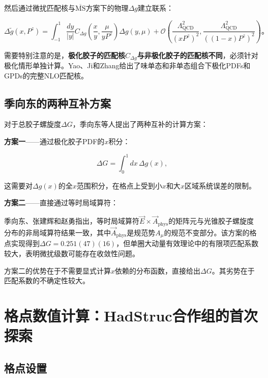 \documentclass[12pt,a4paper]{ctexart}
\theoremstyle{definition}
\begin{document}
然后通过微扰匹配核与$\overline{\text{MS}}$方案下的物理$\Delta g$建立联系\cite{Ji2017More,Yao2023}：

\begin{equation}
\Delta\tilde{g}(x, P^z) = \int_{-1}^1 \frac{dy}{|y|} C_{\Delta g}\left(\frac{x}{y}, \frac{\mu}{yP^z}\right) \Delta g(y, \mu) + \mathcal{O}\left(\frac{\Lambda_{\text{QCD}}^2}{(xP^z)^2}, \frac{\Lambda_{\text{QCD}}^2}{((1-x)P^z)^2}\right)。
\label{eq:matching_Deltag}
\end{equation}

需要特别注意的是，\textbf{极化胶子的匹配核$C_{\Delta g}$与非极化胶子的匹配核不同}，必须针对极化情形单独计算。Yao、Ji和Zhang\cite{Yao2023}给出了味单态和非单态组合下极化PDFs和GPDs的完整NLO匹配核。

\subsection{季向东的两种互补方案}

对于总胶子螺旋度$\Delta G$，季向东等人提出了两种互补的计算方案\cite{Ji2013gluon, Ji2017More}：

\textbf{方案一}——通过极化胶子PDF的$x$积分：

\begin{equation}
\Delta G = \int_0^1 dx\, \Delta g(x),
\label{eq:DeltaG_from_pdf}
\end{equation}

这需要对$\Delta g(x)$的全$x$范围积分，在格点上受到小$x$和大$x$区域系统误差的限制。

\textbf{方案二}——直接通过等时局域算符\cite{Ji2013gluon}：

季向东、张建辉和赵勇指出\cite{Ji2013gluon}，等时局域算符$\vec{E} \times \vec{A}_{\text{phys}}$的矩阵元与光锥胶子螺旋度分布的非局域算符结果一致，其中$\vec{A}_{\text{phys}}$是规范势$A_\mu$的规范不变部分。该方案的格点实现得到$\Delta G = 0.251(47)(16)$，但单圈大动量有效理论中的有限项匹配系数较大，表明微扰级数可能存在收敛性问题\cite{Egerer2022}。

方案二的优势在于不需要显式计算$x$依赖的分布函数，直接给出$\Delta G$。其劣势在于匹配系数的不确定性较大。

\section{格点数值计算：HadStruc合作组的首次探索}

\subsection{格点设置}
\end{document}
